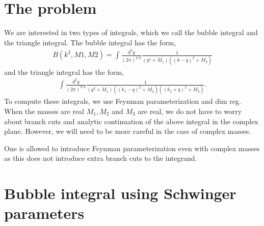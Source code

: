 \documentclass[twoside]{article}
\begin{document}
\section{The problem}
We are interested in two types of integrals, which we call the bubble integral and the triangle integral. The bubble integral has the form,
\begin{align}
\label{eq:bubble}
B(k^2,M1,M2) =  \int \frac{d^3q}{(2\pi)^{3/2}}\frac{1}{(q^2 + M_1)( (k-q)^2 + M_2)}
\end{align}
and the triangle integral has the form,
\begin{align}
  \int \frac{d^3q}{(2\pi)^{3/2}}\frac{1}{(q^2 + M_1)( (k_1-q)^2 + M_2)( (k_2 + q)^2 + M_3)}.
\end{align}
To compute these integrals, we use Feynman parameterization and dim reg. When the masses are real $M_1,M_2$ and $M_3$ are real, we do not
have to worry about branch cuts and analytic continuation of the above integral in the complex plane. However, we will need to be more
careful in the case of complex masses. 

One is allowed to introduce Feynman parameterization even with complex masses as this does not introduce extra branch cuts to the integrand.

\section{Bubble integral using Schwinger parameters}
\end{document}

